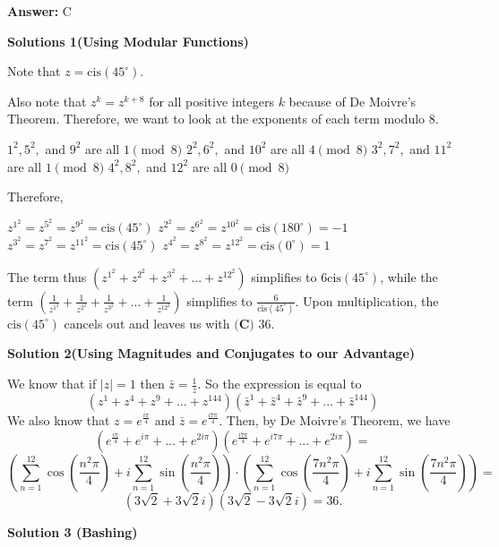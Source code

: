 \begin{enumerate}
 \textbf{Answer: }C



\textbf{Solutions 1(Using Modular Functions)}

Note that $z = \mathrm{cis }(45^{\circ})$.

 Also note that $z^{k} = z^{k + 8}$ for all positive integers $k$ because of De Moivre's Theorem. Therefore, we want to look at the exponents of each term modulo $8$.

 $1^2, 5^2,$ and $9^2$ are all $1 \pmod{8}$
$2^2, 6^2,$ and $10^2$ are all $4 \pmod{8}$
$3^2, 7^2,$ and $11^2$ are all $1 \pmod{8}$
$4^2, 8^2,$ and $12^2$ are all $0 \pmod{8}$

 Therefore,

 $z^{1^2} = z^{5^2} = z^{9^2} = \mathrm{cis }(45^{\circ})$
$z^{2^2} = z^{6^2} = z^{10^2} = \mathrm{cis }(180^{\circ}) = -1$
$z^{3^2} = z^{7^2} = z^{11^2} = \mathrm{cis }(45^{\circ})$
$z^{4^2} = z^{8^2} = z^{12^2} = \mathrm{cis }(0^{\circ}) = 1$

 The term thus $\left(z^{1^2}+z^{2^2}+z^{3^2}+\dots+z^{{12}^2}\right)$ simplifies to $6\mathrm{cis }(45^{\circ})$, while the term $\left(\frac{1}{z^{1^2}}+\frac{1}{z^{2^2}}+\frac{1}{z^{3^2}}+\dots+\frac{1}{z^{{12}^2}}\right)$ simplifies to $\frac{6}{\mathrm{cis }(45^{\circ})}$. Upon multiplication, the $\mathrm{cis }(45^{\circ})$ cancels out and leaves us with $\boxed{\textbf{(C) }36}$.

 



\textbf{Solution 2(Using Magnitudes and Conjugates to our Advantage)}

We know that if $|z|=1$ then $\bar{z}=\frac{1}{z}$. So the expression is equal to 
 \[\left(z^1+z^4+z^9+...+z^{144}\right)\left(\bar{z}^1+\bar{z}^4+\bar{z}^9+...+\bar{z}^{144}\right)\] We also know that $z=e^{\frac{i\pi}{4}}$ and $\bar{z}=e^{\frac{i7\pi}{4}}$. Then, by De Moivre's Theorem, we have 
 \[\left(e^{\frac{i\pi}{4}}+e^{i\pi}+...+e^{2i\pi}\right)\left(e^{\frac{i7\pi}{4}}+e^{i7\pi}+...+e^{2i\pi}\right) =\] 
 \[\left(\sum_{n=1}^{12} \cos\left(\frac{n^2\pi}{4}\right) + i \sum_{n=1}^{12} \sin\left(\frac{n^2\pi}{4}\right)\right) \cdot \left(\sum_{n=1}^{12} \cos\left(\frac{7n^2\pi}{4}\right) + i \sum_{n=1}^{12} \sin\left(\frac{7n^2\pi}{4}\right)\right) =\]
 \[(3\sqrt{2} + 3\sqrt{2}i)(3\sqrt{2} - 3\sqrt{2}i) = \boxed{36}.\]




\textbf{Solution 3 (Bashing)}


\end{enumerate}
